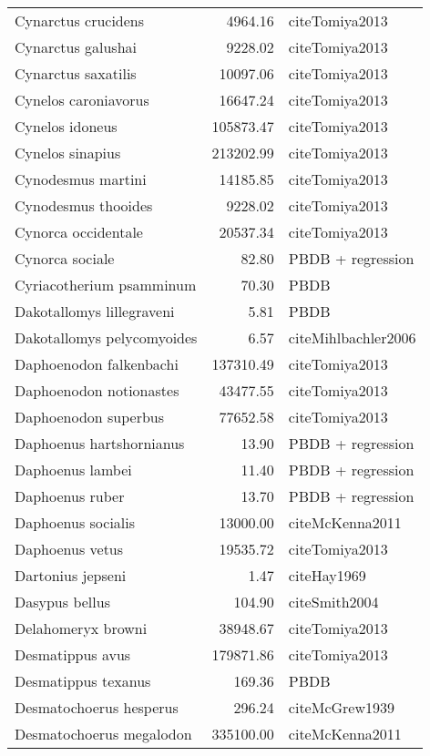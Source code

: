 \begin{table}[ht]
\begin{tabular}{lrl}
  Cynarctus crucidens & 4964.16 & cite{Tomiya2013} \\ 
  Cynarctus galushai & 9228.02 & cite{Tomiya2013} \\ 
  Cynarctus saxatilis & 10097.06 & cite{Tomiya2013} \\ 
  Cynelos caroniavorus & 16647.24 & cite{Tomiya2013} \\ 
  Cynelos idoneus & 105873.47 & cite{Tomiya2013} \\ 
  Cynelos sinapius & 213202.99 & cite{Tomiya2013} \\ 
  Cynodesmus martini & 14185.85 & cite{Tomiya2013} \\ 
  Cynodesmus thooides & 9228.02 & cite{Tomiya2013} \\ 
  Cynorca occidentale & 20537.34 & cite{Tomiya2013} \\ 
  Cynorca sociale & 82.80 & PBDB + regression \\ 
  Cyriacotherium psamminum & 70.30 & PBDB \\ 
  Dakotallomys lillegraveni & 5.81 & PBDB \\ 
  Dakotallomys pelycomyoides & 6.57 & cite{Mihlbachler2006} \\ 
  Daphoenodon falkenbachi & 137310.49 & cite{Tomiya2013} \\ 
  Daphoenodon notionastes & 43477.55 & cite{Tomiya2013} \\ 
  Daphoenodon superbus & 77652.58 & cite{Tomiya2013} \\ 
  Daphoenus hartshornianus & 13.90 & PBDB + regression \\ 
  Daphoenus lambei & 11.40 & PBDB + regression \\ 
  Daphoenus ruber & 13.70 & PBDB + regression \\ 
  Daphoenus socialis & 13000.00 & cite{McKenna2011} \\ 
  Daphoenus vetus & 19535.72 & cite{Tomiya2013} \\ 
  Dartonius jepseni & 1.47 & cite{Hay1969} \\ 
  Dasypus bellus & 104.90 & cite{Smith2004} \\ 
  Delahomeryx browni & 38948.67 & cite{Tomiya2013} \\ 
  Desmatippus avus & 179871.86 & cite{Tomiya2013} \\ 
  Desmatippus texanus & 169.36 & PBDB \\ 
  Desmatochoerus hesperus & 296.24 & cite{McGrew1939} \\ 
  Desmatochoerus megalodon & 335100.00 & cite{McKenna2011} \\ 

\end{tabular}
\end{table}
